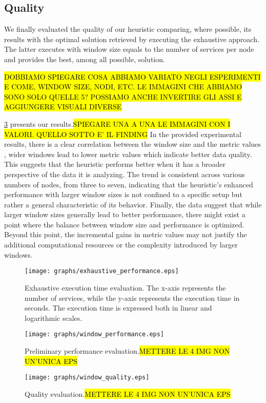 \subsection{Quality}
We finally evaluated the quality of our heuristic comparing, where possible, its results with the optimal solution retrieved by executing the exhaustive approach. The latter executes with window size equals to the number of services per node and provides the best, among all possible, solution.

\hl{DOBBIAMO SPIEGARE COSA ABBIAMO VARIATO NEGLI ESPERIMENTI E COME, WINDOW SIZE, NODI, ETC. LE IMMAGINI CHE ABBIAMO SONO SOLO QUELLE 5? POSSIAMO ANCHE INVERTIRE GLI ASSI E AGGIUNGERE VISUALI DIVERSE}

        \cref{fig:quality_window} presents our results.\hl{SPIEGARE UNA A UNA LE IMMAGINI CON I VALORI. QUELLO SOTTO E' IL FINDING}
        In the provided experimental results, there is a clear correlation between the window size and the metric values
        , wider windows  lead to lower metric values which indicate better data quality.
        This suggests that the heuristic performs better when it has a broader perspective of the data it is analyzing.
        The trend is consistent across various numbers of nodes, from three to seven, indicating that the heuristic's enhanced
        performance with larger window sizes is not confined to a specific setup but rather a general characteristic of its behavior.
        Finally, the data suggest that while larger window sizes generally lead to better performance,
        there might exist a point where the balance between window size and performance is optimized.
        Beyond this point, the incremental gains in metric values may not justify the additional computational resources or the complexity introduced by larger windows.


\begin{figure}
  \texttt{[image: graphs/exhaustive\_performance.eps]}
  \caption{Exhaustive execution time evaluation. The x-axis represents the number of services, while the y-axis represents the execution time in seconds. The execution time is expressed both in linear and logarithmic scales.}
  \label{fig:perf_exhaustive}
\end{figure}

\begin{figure}[!t]
  \texttt{[image: graphs/window\_performance.eps]}
  \caption{Preliminary performance evaluation.\hl{METTERE LE 4 IMG NON UN'UNICA EPS}}
  \label{fig:perf_window}
\end{figure}


\begin{figure}[!t]
  \texttt{[image: graphs/window\_quality.eps]}
  \caption{Quality evaluation.\hl{METTERE LE 4 IMG NON UN'UNICA EPS}}
  \label{fig:quality_window}
\end{figure}

